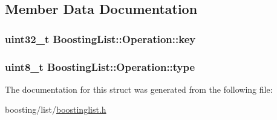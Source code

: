 \subsection{Member Data Documentation}
\hypertarget{structBoostingList_1_1Operation_a8e20924c8bef9709d1edd3c516986372}{
\subsubsection[{key}]{\setlength{\rightskip}{0pt plus 5cm}uint32\-\_\-t Boosting\-List\-::\-Operation\-::key}}\label{structBoostingList_1_1Operation_a8e20924c8bef9709d1edd3c516986372}
\hypertarget{structBoostingList_1_1Operation_acd4638c8a2392627655419fc62f85822}{
\subsubsection[{type}]{\setlength{\rightskip}{0pt plus 5cm}uint8\-\_\-t Boosting\-List\-::\-Operation\-::type}}\label{structBoostingList_1_1Operation_acd4638c8a2392627655419fc62f85822}


The documentation for this struct was generated from the following file\-:\begin{DoxyCompactItemize}
\item 
boosting/list/\hyperlink{boostinglist_8h}{boostinglist.\-h}\end{DoxyCompactItemize}
